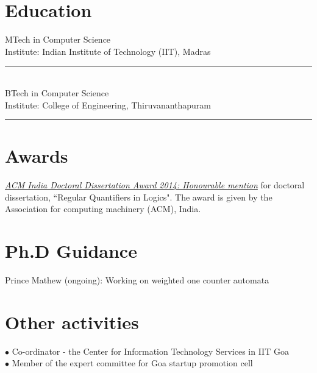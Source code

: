 \documentclass[margin]{res}
\begin{document}
\begin{resume}
\section{Education} 
					MTech in Computer Science \\
					Institute: Indian Institute of Technology (IIT), Madras \\
					\noindent\rule{13cm}{0.4pt} \\
					BTech in Computer Science \\
					Institute: College of Engineering, Thiruvananthapuram  \\
					\noindent\rule{13cm}{0.4pt} 
	
\section{Awards}
\href{http://awards.acm.org/award_winners/sreejith_9923861.cfm}{{\emph{ACM India Doctoral Dissertation Award 2014: Honourable mention}}} for doctoral dissertation, ``Regular Quantifiers in Logics". The award is given by the Association for computing machinery (ACM), India. \\
				
					
\section{Ph.D Guidance}
Prince Mathew (ongoing): Working on weighted one counter automata

\section{Other activities}
$\bullet$ Co-ordinator - the Center for Information Technology Services in IIT Goa \\
$\bullet$ Member of the expert committee for Goa startup promotion cell



\end{resume}
\end{document}
